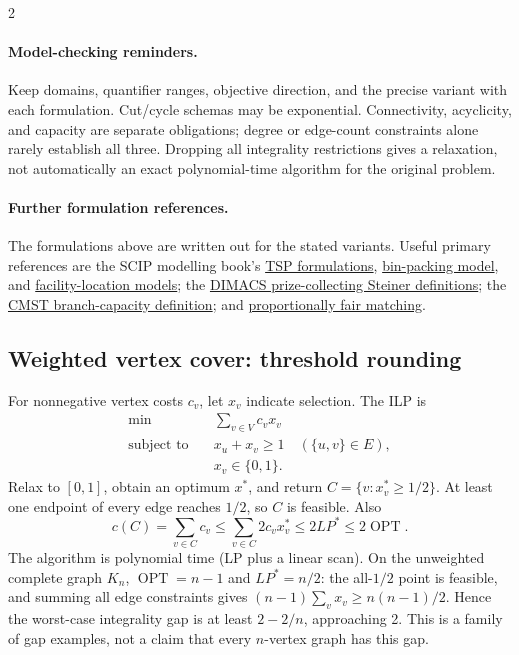 \documentclass[8pt]{extarticle}
\theoremstyle{definition}
\newcommand{\OPT}{\operatorname{OPT}}
\begin{document}
\begin{multicols*}{2}
\paragraph{Model-checking reminders.}
Keep domains, quantifier ranges, objective direction, and the precise
variant with each formulation. Cut/cycle schemas may be exponential.
Connectivity, acyclicity, and capacity are separate obligations; degree or
edge-count constraints alone rarely establish all three. Dropping all
integrality restrictions gives a relaxation, not automatically an exact
polynomial-time algorithm for the original problem.

\paragraph{Further formulation references.}
The formulations above are written out for the stated variants. Useful
primary references are the SCIP modelling book's
\href{https://scipbook.readthedocs.io/en/latest/routing.html}{TSP formulations},
\href{https://github.com/joaopedroso/scipbook/blob/master/docs/bpp.rst}{bin-packing model},
and \href{https://scipbook.readthedocs.io/en/latest/flp.html}{facility-location models};
the \href{https://dimacs11.zib.de/downloads.html}{DIMACS prize-collecting Steiner definitions};
the \href{https://optimization-online.org/wp-content/uploads/2006/05/1404.pdf}{CMST branch-capacity definition};
and \href{https://arxiv.org/abs/2301.03862}{proportionally fair matching}.

\subsection{Weighted vertex cover: threshold rounding}\label{lp:vc}
For nonnegative vertex costs $c_v$, let $x_v$ indicate selection. The ILP is
\[
\begin{aligned}
  \min\quad &\sum_{v\in V}c_vx_v\\
  \text{subject to}\quad &x_u+x_v\ge1\quad(\{u,v\}\in E),\\
  &x_v\in\{0,1\}.
\end{aligned}
\]
Relax to $[0,1]$, obtain an optimum $x^*$, and return
$C=\{v:x_v^*\ge1/2\}$. At least one endpoint of every edge reaches $1/2$,
so $C$ is feasible. Also
\[
  c(C)=\sum_{v\in C}c_v
    \le\sum_{v\in C}2c_vx_v^*
    \le2LP^*\le2\OPT.
\]
The algorithm is polynomial time (LP plus a linear scan).
On the unweighted complete graph $K_n$, $\OPT=n-1$ and $LP^*=n/2$:
the all-$1/2$ point is feasible, and summing all edge constraints gives
$(n-1)\sum_vx_v\ge n(n-1)/2$. Hence the worst-case integrality gap is
at least $2-2/n$, approaching 2. This is a family of gap examples, not a
claim that every $n$-vertex graph has this gap.


\end{multicols*}
\end{document}
